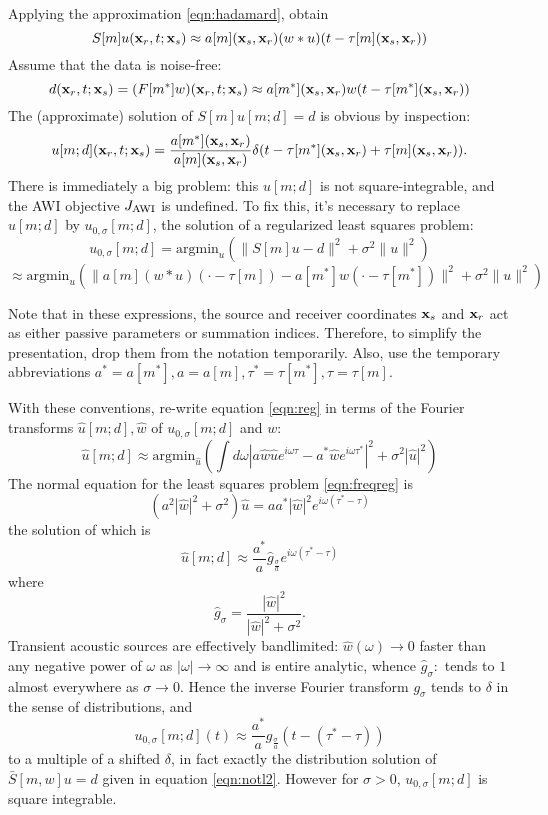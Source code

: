 Applying the approximation \ref{eqn:hadamard}, obtain
\begin{equation}
  \label{eqn:spwe}
S[m]u({\bf x}_r,t;{\bf x}_s) \approx a[m]({\bf x}_s,{\bf x}_r) (w*u)(t-\tau[m]({\bf x}_s,{\bf x}_r))
\end{equation}
Assume that the data is noise-free:
$$
d({\bf x}_r,t;{\bf x}_s)=(F[m^*]w) ({\bf x}_r,t;{\bf x}_s) \approx a[m^*]({\bf x}_s,{\bf x}_r) w(t-\tau[m^*]({\bf x}_s,{\bf x}_r))
$$
The (approximate) solution of $S[m]u[m;d]=d$ is obvious by inspection:
\begin{equation}
  \label{eqn:notl2}
  u[m;d]({\bf x}_r,t;{\bf x}_s) = \frac{a[m^*]({\bf x}_s,{\bf x}_r)}{a[m]({\bf x}_s,{\bf x}_r)}\delta(t-\tau[m^*]({\bf x}_s,{\bf x}_r)+\tau[m]({\bf x}_s,{\bf x}_r)).
\end{equation}
There is immediately a big problem: this $u[m;d]$ is not
square-integrable, and the AWI objective $J_{\rm AWI}$ is
undefined. To fix this, it's necessary to replace $u[m;d]$ by
$u_{0,\sigma}[m;d]$,  the solution of a regularized least squares problem: 
\begin{equation}
  \label{eqn:reg}
  u_{0,\sigma}[m;d] = \mbox{argmin}_u (\|S[m]u-d\|^2 + \sigma^2\|u\|^2)
\end{equation}
$$
\approx \mbox{argmin}_u (\|a[m](w*u)(\cdot-\tau[m])-a[m^*]w(\cdot-\tau[m^*])\|^2 + \sigma^2\|u\|^2)
$$

Note that in these expressions, the source and receiver
coordinates ${\bf x}_s$ and ${\bf x}_r$ act as either passive parameters
or summation indices. Therefore, to simplify the presentation, drop them from the notation
temporarily. Also,  use the temporary abbreviations $a^*=a[m^*], a=a[m], \tau^*=\tau[m^*],
\tau=\tau[m]$.

With these conventions, re-write equation \ref{eqn:reg} in terms of the Fourier transforms $\hat{u}[m;d],\hat{w}$ of $u_{0,\sigma}[m;d]$ and $w$:
\begin{equation}
  \label{eqn:freqreg}
\hat{u}[m;d] \approx \mbox{argmin}_{\hat{u}}\left(\int d\omega |a\hat{w}\hat{u}e^{i\omega \tau}-a^*\hat{w}e^{i\omega\tau^*}|^2 + \sigma^2 |\hat{u}|^2\right)
\end{equation}
The normal equation for the least squares problem \ref{eqn:freqreg} is
\[
(a^2 |\hat{w}|^2 +\sigma^2)\hat{u} = a a^*|\hat{w}|^2e^{i\omega(\tau^*-\tau)}
\]
the solution of which is
\[
\hat{u}[m;d] \approx \frac{a^*}{a}\hat{g}_{\frac{\sigma}{a}} e^{i\omega(\tau^*-\tau)}
\]
where
$$ 
\hat{g}_{\sigma} = \frac{|\hat{w}|^2}{|\hat{w}|^2 + \sigma^2}.
$$
Transient acoustic sources are effectively bandlimited:
$\hat{w}(\omega) \rightarrow 0$ faster than any negative power of
$\omega$ as $|\omega| \rightarrow \infty$ and is entire analytic, whence $\hat{g}_{\sigma}:$ tends to $1$ almost everywhere as $\sigma \rightarrow 0$. Hence the inverse Fourier transform $g_{\sigma}$ tends to $\delta$ in the sense of distributions, and 
$$
u_{0,\sigma}[m;d](t) \approx \frac{a^*}{a}g_{\frac{\sigma}{a}}(t-(\tau^*-\tau))
$$
to a multiple of a shifted $\delta$, in fact exactly the distribution
solution of $\bar{S}[m,w]u=d$ given in equation \ref{eqn:notl2}. However for $\sigma>0$, $u_{0,\sigma}[m;d]$ is square integrable.

